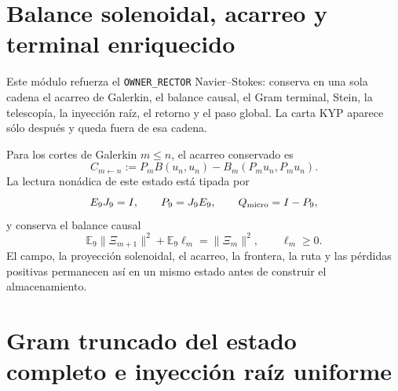 \section*{Balance solenoidal, acarreo y terminal enriquecido}

Este módulo refuerza el \texttt{OWNER\_RECTOR} Navier--Stokes: conserva en
una sola cadena el acarreo de Galerkin, el balance causal, el Gram terminal,
Stein, la telescopía, la inyección raíz, el retorno y el paso global. La carta
KYP aparece sólo después y queda fuera de esa cadena.

Para los cortes de Galerkin \(m\leq n\), el acarreo conservado es
\begin{equation}\label{eq:amp-ns-owner-acarreo-galerkin}
 C_{m\leftarrow n}
 :=P_mB(u_n,u_n)-B_m(P_m u_n,P_m u_n).
\end{equation}
La lectura nonádica de este estado está tipada por
\begin{equation}\label{eq:amp-ns-owner-e9j9}
 E_9J_9=I,\qquad P_9=J_9E_9,\qquad Q_{\rm micro}=I-P_9,
\end{equation}
y conserva el balance causal
\begin{equation}\label{eq:amp-ns-owner-balance-causal}
 \boxed{
 \mathbb E_9\|\Xi_{m+1}\|^2+\mathbb E_9\ell_m
 =\|\Xi_m\|^2,\qquad \ell_m\geq0.}
\end{equation}
El campo, la proyección solenoidal, el acarreo, la frontera, la ruta y las
pérdidas positivas permanecen así en un mismo estado antes de construir el
almacenamiento.

\section*{Gram truncado del estado completo e inyección raíz uniforme}


